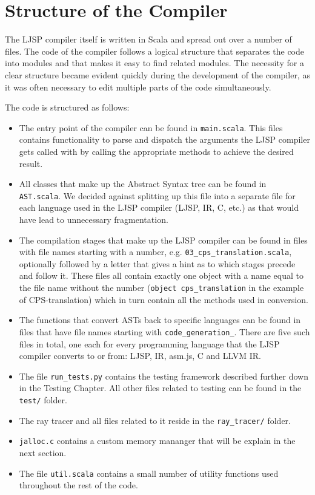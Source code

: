 \documentclass[11pt]{report}
\begin{document}
\section{Structure of the Compiler}
The LJSP compiler itself is written in Scala and spread out over a number of files. The code of the compiler follows a logical structure that separates the code into modules and that makes it easy to find related modules. The necessity for a clear structure became evident quickly during the development of the compiler, as it was often necessary to edit multiple parts of the code simultaneously.

The code is structured as follows:
\begin{itemize}
\item The entry point of the compiler can be found in \texttt{main.scala}. This files contains functionality to parse and dispatch the arguments the LJSP compiler gets called with by calling the appropriate methods to achieve the desired result.
\item All classes that make up the Abstract Syntax tree can be found in \texttt{AST.scala}. We decided against splitting up this file into a separate file for each language used in the LJSP compiler (LJSP, IR, C, etc.) as that would have lead to unnecessary fragmentation.
\item The compilation stages that make up the LJSP compiler can be found in files with file names starting with a number, e.g. \texttt{03_cps_translation.scala}, optionally followed by a letter that gives a hint as to which stages precede and follow it. These files all contain exactly one object with a name equal to the file name without the number (\texttt{object cps_translation} in the example of CPS-translation) which in turn contain all the methods used in conversion. 
\item The functions that convert ASTs back to specific languages can be found in files that have file names starting with \texttt{code_generation_}. There are five such files in total, one each for every programming language that the LJSP compiler converts to or from: LJSP, IR, asm.js, C and LLVM IR.
\item The file \texttt{run_tests.py} contains the testing framework described further down in the Testing Chapter. All other files related to testing can be found in the \texttt{test/} folder.
\item The ray tracer and all files related to it reside in the \texttt{ray_tracer/} folder.
\item \texttt{jalloc.c} contains a custom memory mananger that will be explain in the next section.
\item The file \texttt{util.scala} contains a small number of utility functions used throughout the rest of the code.
\end{itemize}
\end{document}
